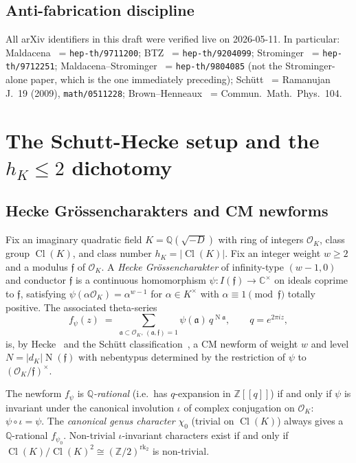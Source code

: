 \documentclass[11pt,a4paper]{amsart}
\theoremstyle{definition}
\DeclareMathOperator{\Cl}{Cl}
\DeclareMathOperator{\rk}{rk}
\DeclareMathOperator{\Nm}{N}
\newcommand{\Q}{\mathbb{Q}}
\newcommand{\Z}{\mathbb{Z}}
\newcommand{\C}{\mathbb{C}}
\newcommand{\OK}{\mathcal{O}_K}
\newcommand{\fa}{\mathfrak{a}}
\newcommand{\ff}{\mathfrak{f}}
\newcommand{\hK}{h_{K}}
\newcommand{\rktwo}{\rk_{2}}
\begin{document}
\subsection{Anti-fabrication discipline}\label{ss:intro-disc}

All arXiv identifiers in this draft were verified live on 2026-05-11. In particular:
Maldacena~\cite{Maldacena1997} = \texttt{hep-th/9711200}; BTZ~\cite{BTZ1992} =
\texttt{hep-th/9204099}; Strominger~\cite{Strominger1998} = \texttt{hep-th/9712251};
Maldacena--Strominger~\cite{MaldacenaStrominger1998} = \texttt{hep-th/9804085}
(not the Strominger-alone paper, which is the one immediately preceding);
Sch\"utt~\cite{Schutt2009} = Ramanujan J.\ 19 (2009), \texttt{math/0511228};
Brown--Henneaux~\cite{BrownHenneaux1986} = Commun.\ Math.\ Phys.\ 104.

\section{The Schutt-Hecke setup and the $h_K\le 2$ dichotomy}\label{sec:Schutt-Hecke}

\subsection{Hecke Gr\"ossencharakters and CM newforms}\label{ss:Schutt-setup}

Fix an imaginary quadratic field $K = \Q(\sqrt{-D})$ with ring of integers $\OK$, class
group $\Cl(K)$, and class number $\hK = |\Cl(K)|$. Fix an integer weight $w \ge 2$ and a
modulus $\ff$ of $\OK$. A \emph{Hecke Gr\"ossencharakter} of infinity-type $(w-1, 0)$ and
conductor $\ff$ is a continuous homomorphism $\psi : I(\ff) \to \C^\times$ on ideals
coprime to $\ff$, satisfying $\psi(\alpha\OK) = \alpha^{w-1}$ for $\alpha \in K^\times$ with
$\alpha \equiv 1 \pmod{\ff}$ totally positive. The associated theta-series
\begin{equation}\label{eq:theta-series}
  f_\psi(z) \;=\; \sum_{\fa \subset \OK,\,(\fa,\ff)=1}\psi(\fa)\, q^{\Nm\fa},
  \qquad q = e^{2\pi i z},
\end{equation}
is, by Hecke~\cite{Hecke1936} and the Sch\"utt classification~\cite{Schutt2009}, a CM
newform of weight $w$ and level $N = |d_K|\Nm(\ff)$ with nebentypus determined by the
restriction of $\psi$ to $(\OK/\ff)^\times$.

The newform $f_\psi$ is \emph{$\Q$-rational} (i.e.\ has $q$-expansion in $\Z[[q]]$) if and
only if $\psi$ is invariant under the canonical involution $\iota$ of complex conjugation
on $\OK$: $\psi \circ \iota = \psi$. The \emph{canonical genus character} $\chi_0$ (trivial
on $\Cl(K)$) always gives a $\Q$-rational $f_{\psi_0}$. Non-trivial $\iota$-invariant
characters exist if and only if $\Cl(K)/\Cl(K)^2 \cong (\Z/2)^{\rktwo}$ is non-trivial.
\end{document}
